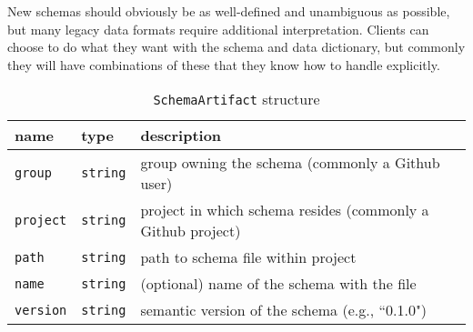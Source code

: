 \documentclass[10pt]{article}
\newcommand{\ttt}[1]{\texttt{#1}}
\begin{document}
\begin{appendices}
New schemas should obviously be as well-defined and unambiguous as possible, but many legacy data formats require additional interpretation. Clients can choose to do what they want with the schema and data dictionary, but commonly they will have combinations of these that they know how to handle explicitly.

\begin{table}[htb]
	\caption*{\ttt{SchemaArtifact} structure}
	\begin{small}
	\begin{tabular}{lll}
		\toprule
		name & type  & description \\ \midrule
		\ttt{group} & \ttt{string} & group owning the schema (commonly a Github user) \\
		\ttt{project} & \ttt{string} & project in which schema resides (commonly a Github project) \\
		\ttt{path} & \ttt{string} & path to schema file within project \\
		\ttt{name} & \ttt{string} & (optional) name of the schema with the file \\
		\ttt{version} & \ttt{string} & semantic version of the schema (e.g., ``0.1.0") \\
		\bottomrule
	\end{tabular}
	\end{small}
\end{table}


\end{appendices}

\pagebreak

\printbibliography
\end{document}
